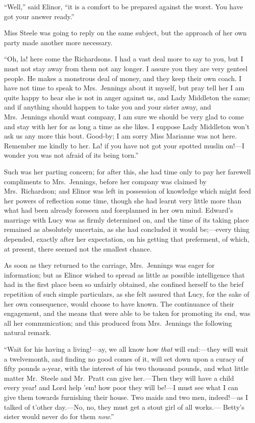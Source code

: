 ``Well,'' said Elinor, ``it is a comfort to be prepared
against the worst.  You have got your answer ready.''

Miss Steele was going to reply on the same subject,
but the approach of her own party made another more necessary.

``Oh, la! here come the Richardsons.  I had a vast deal
more to say to you, but I must not stay away from them not
any longer.  I assure you they are very genteel people.
He makes a monstrous deal of money, and they keep their
own coach.  I have not time to speak to Mrs.\ Jennings about
it myself, but pray tell her I am quite happy to hear she
is not in anger against us, and Lady Middleton the same;
and if anything should happen to take you and your
sister away, and Mrs.\ Jennings should want company,
I am sure we should be very glad to come and stay with her
for as long a time as she likes.  I suppose Lady Middleton
won't ask us any more this bout.  Good-by; I am sorry
Miss Marianne was not here.  Remember me kindly to her.
La! if you have not got your spotted muslin on!---I wonder
you was not afraid of its being torn.''

Such was her parting concern; for after this, she had
time only to pay her farewell compliments to Mrs.\ Jennings,
before her company was claimed by Mrs.\ Richardson;
and Elinor was left in possession of knowledge which
might feed her powers of reflection some time, though she
had learnt very little more than what had been already
foreseen and foreplanned in her own mind.  Edward's marriage
with Lucy was as firmly determined on, and the time
of its taking place remained as absolutely uncertain,
as she had concluded it would be;---every thing depended,
exactly after her expectation, on his getting that preferment,
of which, at present, there seemed not the smallest chance.

As soon as they returned to the carriage,
Mrs.\ Jennings was eager for information; but as Elinor
wished to spread as little as possible intelligence
that had in the first place been so unfairly obtained,
she confined herself to the brief repetition of such
simple particulars, as she felt assured that Lucy,
for the sake of her own consequence, would choose
to have known.  The continuance of their engagement,
and the means that were able to be taken for promoting
its end, was all her communication; and this produced
from Mrs.\ Jennings the following natural remark.

``Wait for his having a living!---ay, we all know how
\emph{that} will end:---they will wait a twelvemonth, and finding
no good comes of it, will set down upon a curacy of fifty
pounds a-year, with the interest of his two thousand pounds,
and what little matter Mr.\ Steele and Mr.\ Pratt can
give her.---Then they will have a child every year! and
Lord help 'em! how poor they will be!---I must see
what I can give them towards furnishing their house.
Two maids and two men, indeed!---as I talked of t'other
day.---No, no, they must get a stout girl of all works.---%
Betty's sister would never do for them \emph{now}.''

